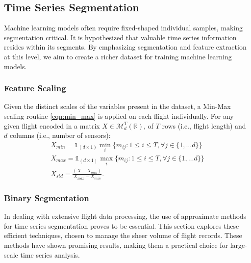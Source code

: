\documentclass{IEEEtran}
\begin{document}
        \subsection{Time Series Segmentation} \label{sec:segmentation}

            Machine learning models often require fixed-shaped individual samples, making segmentation critical. It is hypothesized that valuable time series information resides within its segments. By emphasizing segmentation and feature extraction at this level, we aim to create a richer dataset for training machine learning models.

            \subsubsection{Feature Scaling}

                Given the distinct scales of the variables present in the dataset, a Min-Max scaling routine \eqref{eqn:min_max} is applied on each flight individually. For any given flight encoded in a matrix $X \in \mathcal{M}_{d}^{T}(\mathbb{R})$, of $T$ rows (i.e., flight length) and $d$ columns (i.e., number of sensors):
                \begin{equation} \label{eqn:min_max}
                    \begin{gathered}
                        X_{min} = \mathds{1}_{(d \times 1)} \min_i \{m_{ij}: 1 \leq i \leq T, \forall j \in \{1, \dots d\}\} \\
                        X_{max} = \mathds{1}_{(d \times 1)} \max_i \{m_{ij}: 1 \leq i \leq T, \forall j \in \{1, \dots d\}\} \\
                        X_{std} = \frac{(X - X_{min})}{X_{max} - X_{min}}.
                    \end{gathered}
                \end{equation}

            \subsubsection{Binary Segmentation}

                In dealing with extensive flight data processing, the use of approximate methods for time series segmentation proves to be essential. This section explores these efficient techniques, chosen to manage the sheer volume of flight records. These methods have shown promising results, making them a practical choice for large-scale time series analysis.
\end{document}
